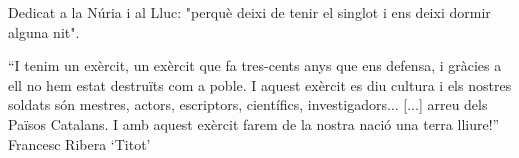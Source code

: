 Dedicat a la Núria i al Lluc: "perquè deixi de tenir el singlot i ens
deixi dormir alguna nit".

  


``I tenim un exèrcit, un exèrcit que fa tres-cents anys que ens defensa, i gràcies a ell no hem estat destruïts com a poble. I aquest exèrcit es diu cultura i els nostres soldats són mestres, actors, escriptors, científics, investigadors... [...] arreu dels Països Catalans. I amb aquest exèrcit farem de la nostra nació una terra lliure!'' Francesc Ribera `Titot'








